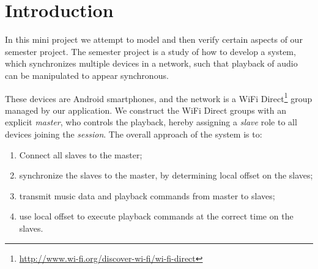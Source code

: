 \chapter{Introduction}
In this mini project we attempt to model and then verify certain aspects of our semester project.
The semester project is a study of how to develop a system, which synchronizes multiple devices in a network, such that playback of audio can be manipulated to appear synchronous.

These devices are Android smartphones, and the network is a WiFi Direct\footnote{\url{http://www.wi-fi.org/discover-wi-fi/wi-fi-direct}} group managed by our application.
We construct the WiFi Direct groups with an explicit \textit{master}, who controls the playback, hereby assigning a \textit{slave} role to all devices joining the \textit{session}.
The overall approach of the system is to:
\begin{enumerate}[label=\itshape\alph*\upshape)]
    \item Connect all slaves to the master;\label{itm:connect}
    \item synchronize the slaves to the master, by determining local offset on the slaves;\label{itm:sync}
    \item transmit music data and playback commands from master to slaves;\label{itm:txrx}
    \item use local offset to execute playback commands at the correct time on the slaves.
\end{enumerate}

